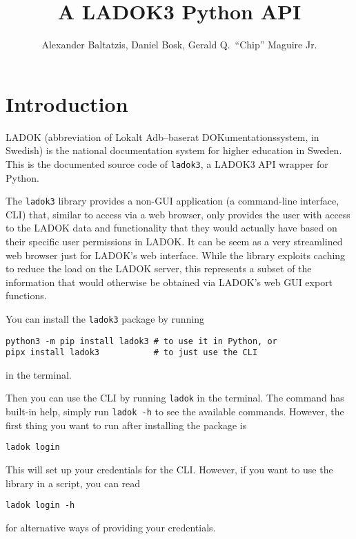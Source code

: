 \documentclass[a4paper,oneside]{memoir}
\title{%
  A LADOK3 Python API
}
\author{%
  Alexander Baltatzis,
  Daniel Bosk,
  Gerald Q.\ \enquote{Chip} Maguire Jr.
}
\affil{%
  KTH EECS\\
  \texttt{\{alba,dbosk,maguire\}@kth.se}
}
\begin{document}
\frontmatter
\maketitle

\vspace*{\fill}
\clearpage

\begin{abstract}
  
\end{abstract}
\clearpage

\tableofcontents*
\clearpage

\mainmatter
\chapter{Introduction}

LADOK (abbreviation of \foreignlanguage{swedish}{Lokalt Adb–baserat 
DOKumentationssystem}, in Swedish) is the national documentation system for 
higher education in Sweden.
This is the documented source code of \texttt{ladok3}, a LADOK3 API wrapper for 
Python.

The \texttt{ladok3} library provides a non-GUI application (a command-line 
interface, CLI) that, similar to access via a web browser, only provides the 
user with access to the LADOK data and functionality that they would actually 
have based on their specific user permissions in LADOK.
It can be seem as a very streamlined web browser just for LADOK's web 
interface.
While the library exploits caching to reduce the load on the LADOK server, this 
represents a subset of the information that would otherwise be obtained via
LADOK's web GUI export functions.

You can install the \texttt{ladok3} package by running
\begin{verbatim}
python3 -m pip install ladok3 # to use it in Python, or
pipx install ladok3           # to just use the CLI
\end{verbatim}
in the terminal.

Then you can use the CLI by running \texttt{ladok} in the terminal.
The command has built-in help, simply run \texttt{ladok -h} to see 
the available commands.
However, the first thing you want to run after installing the package is
\begin{verbatim}
ladok login
\end{verbatim}
This will set up your credentials for the CLI.
However, if you want to use the library in a script, you can read
\begin{verbatim}
ladok login -h
\end{verbatim}
for alternative ways of providing your credentials.
\end{document}
